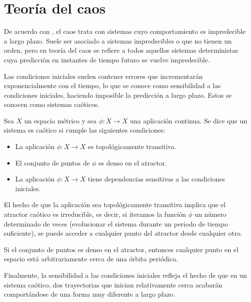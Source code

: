 \section{Teoría del caos}

De acuerdo con \cite{caos}, el caos trata con sistemas cuyo comportamiento es impredecible a largo plazo. Suele ser asociado a sistemas impredecibles o que no tienen un orden, pero en teoría del caos se refiere a todos aquellos sistemas deterministas cuya predicción en instantes de tiempo futuro se vuelve impredecible. 

Las condiciones iniciales suelen contener errores que incrementarán exponencialmente con el tiempo, lo que se conoce como sensibilidad a las condiciones iniciales, haciendo imposible la predicción a largo plazo. Estos se conocen como sistemas caóticos.

\begin{definition}
	
	Sea $X$ un espacio métrico y sea $\phi: X \to X$ una aplicación continua. Se dice que un sistema es caótico si cumple las siguientes condiciones:
	
	\begin{itemize}
		
		\item La aplicación $\phi: X \to X$ es topológicamente transitiva. 
		
		\item El conjunto de puntos de $\phi$ es denso en el atractor. 
		
		\item La aplicación $\phi: X \to X$ tiene dependencias sensitivas a las condiciones iniciales. 
		
	\end{itemize}	
	
\end{definition}

El hecho de que la aplicación sea topológicamente transitiva implica que el atractor caótico es irreducible, es decir, si iteramos la función $\phi$ un número determinado de veces (evolucionar el sistema durante un periodo de tiempo suficiente), se puede acceder a cualquier punto del atractor desde cualquier otro.

Si el conjunto de puntos es denso en el atractor, entonces cualquier punto en el espacio está arbitrariamente cerca de una órbita periódica. 

Finalmente, la sensibilidad a las condiciones iniciales refleja el hecho de que en un sistema caótico, dos trayectorias que inician relativamente cerca acabarán comportándose de una forma muy diferente a largo plazo. 

